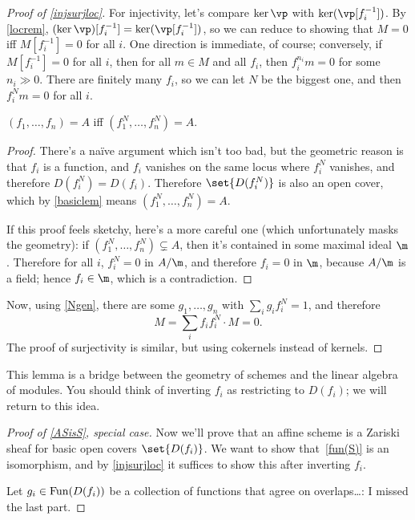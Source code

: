 \begin{proof}[Proof of \cref{injsurjloc}]
For injectivity, let's compare $\ker\vp$ with $\ker(\vp[f_i^{-1}])$. By \cref{locrem}, $(\ker\vp)[f_i^{-1}] =
\ker(\vp[f_i^{-1}])$, so we can reduce to showing that $M = 0$ iff $M[f_i^{-1}] = 0$ for all $i$. One direction is
immediate, of course; conversely, if $M[f_i^{-1}] = 0$ for all $i$, then for all $m\in M$ and all $f_i$, then
$f_i^{n_i}m = 0$ for some $n_i\gg 0$. There are finitely many $f_i$, so we can let $N$ be the biggest one, and then
$f_i^Nm = 0$ for all $i$.
\begin{lem}
\label{Ngen}
$(f_1,\dotsc,f_n) = A$ iff $(f_1^N,\dotsc,f_n^N) = A$.
\end{lem}
\begin{proof}There's a naïve argument which isn't too bad,
but the geometric reason is that $f_i$ is a function, and $f_i$ vanishes on the same locus where $f_i^N$ vanishes,
and therefore $D(f_i^N) = D(f_i)$. Therefore $\set{D(f_i^N)}$ is also an open cover, which by \eqref{basiclem}
means $(f_1^N,\dotsc,f_n^N) = A$.

If this proof feels sketchy, here's a more careful one (which unfortunately masks the geometry): if
$(f_1^N,\dotsc,f_n^N)\subsetneq A$, then it's contained in some maximal ideal $\m$. Therefore for all $i$, $f_i^N =
0$ in $A/\m$, and therefore $f_i = 0$ in $\m$, because $A/\m$ is a field; hence $f_i\in\m$, which is a
contradiction.
\end{proof}
Now, using \cref{Ngen}, there are some $g_1,\dotsc,g_n$ with $\sum_i g_if_i^N = 1$, and therefore
\begin{equation}
	M = \sum_i f_if_i^N\cdot M = 0.
\end{equation}
The proof of surjectivity is similar, but using cokernels instead of kernels.
\end{proof}
This lemma is a bridge between the geometry of schemes and the linear algebra of modules. You should think of
inverting $f_i$ as restricting to $D(f_i)$; we will return to this idea.
\begin{proof}[Proof of \cref{ASisS}, special case]
Now we'll prove that an affine scheme is a Zariski sheaf for basic open covers $\set{D(f_i)}$. We want to show
that~\eqref{fun(S)} is an isomorphism, and by \cref{injsurjloc} it suffices to show this after inverting $f_i$.

Let $g_i\in\mathrm{Fun}(D(f_i))$ be a collection of functions that agree on overlaps\dots \TODO: I missed the last part.
\end{proof}
